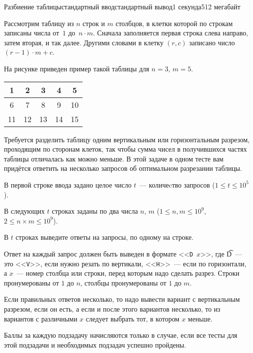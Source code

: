 \begin{problem}{Разбиение таблицы}{стандартный ввод}{стандартный вывод}{1 секунда}{512 мегабайт}

Рассмотрим таблицу из $n$ строк и $m$ столбцов, в клетки которой по строкам записаны числа от~$1$ до~$n \cdot m$. Сначала заполняется первая строка слева направо, затем вторая, и так далее. Другими словами в клетку $(r, c)$ записано число $(r - 1) \cdot m + c$. 

На рисунке приведен пример такой таблицы для $n = 3$, $m = 5$.

\begin{center}
\begin{tabular}{|c|c|c|c|c|}
\hline
1&2&3&4&5\\
\hline
6&7&8&9&10\\
\hline
11&12&13&14&15\\
\hline
\end{tabular}
\end{center}

Требуется разделить таблицу одним вертикальным или горизонтальным разрезом, проходящим по сторонам клеток, так чтобы сумма чисел в получившихся частях таблицы отличалась как можно меньше. В этой задаче в одном тесте вам придётся ответить на несколько запросов об оптимальном разрезании таблицы.

\InputFile
В первой строке ввода задано целое число $t$~--- количеcтво запросов ($1 \le t \le 10^5$). 

В следующих $t$ строках заданы по два числа $n$, $m$ ($1 \le n, m \le 10^9$, $2 \le n \times m \le 10^9$).

\OutputFile
В $t$ строках выведите ответы на запросы, по одному на строке. 

Ответ на каждый запрос должен быть выведен в формате <<\texttt{D $x$}>>, где \t{D}~--- это <<\texttt{V}>>, если нужно резать по вертикали, <<\texttt{H}>>~--- если по горизонтали, а $x$~--- номер столбца или строки, перед которым надо сделать разрез.
Строки пронумерованы от $1$ до $n$, столбцы пронумерованы от $1$ до $m$.

Если правильных ответов несколько, то надо вывести вариант с вертикальным разрезом, если он есть, а если и после этого вариантов несколько, то из вариантов с различными $x$ следует выбрать тот, в котором $x$ меньше.

\Scoring
Баллы за каждую подзадачу начисляются только в случае, если все тесты для этой
подзадачи и необходимых подзадач успешно пройдены.


\end{problem}
